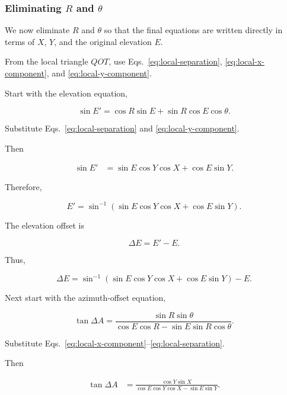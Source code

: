 \documentclass[12pt]{extarticle}
\begin{document}
\subsubsection{Eliminating \texorpdfstring{$R$ and $\theta$}{R and theta}}

We now eliminate $R$ and $\theta$ so that the final equations are written directly in terms of $X$, $Y$, and the original elevation $E$.

From the local triangle $QOT$, use Eqs.~\eqref{eq:local-separation}, \eqref{eq:local-x-component}, and \eqref{eq:local-y-component}.

Start with the elevation equation,

\begin{equation} \sin E' = \cos R\sin E + \sin R\cos E\cos\theta. \end{equation}

Substitute Eqs.~\eqref{eq:local-separation} and \eqref{eq:local-y-component}.

Then

\begin{align}
\sin E'
&= \sin E\cos Y\cos X + \cos E\sin Y .
\end{align}

Therefore,

\begin{equation} \boxed{E' = \sin^{-1}\left(\sin E\cos Y\cos X + \cos E\sin Y\right)}. \end{equation}

The elevation offset is

\begin{equation} \Delta E = E' - E. \end{equation}

Thus,

\begin{equation} \boxed{\Delta E = \sin^{-1}\left(\sin E\cos Y\cos X + \cos E\sin Y\right) - E}. \end{equation}

Next start with the azimuth-offset equation,

\begin{equation} \tan\Delta A = \frac{\sin R\sin\theta}{\cos E\cos R - \sin E\sin R\cos\theta}. \end{equation}

Substitute Eqs.~\eqref{eq:local-x-component}--\eqref{eq:local-separation}.

Then

\begin{align}
\tan\Delta A
&=
\frac{\cos Y\sin X}
{\cos E\cos Y\cos X - \sin E\sin Y}.
\end{align}
\end{document}
